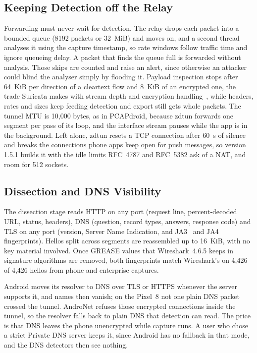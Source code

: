 \documentclass[runningheads]{llncs}
\begin{document}
\subsection{Keeping Detection off the Relay}\label{sec:relay}

Forwarding must never wait for detection. The relay drops each packet into a bounded queue (8192 packets or 32~MiB) and moves on, and a second thread analyses it using the capture timestamp, so rate windows follow traffic time and ignore queueing delay. A packet that finds the queue full is forwarded without analysis. Those skips are counted and raise an alert, since otherwise an attacker could blind the analyser simply by flooding it. Payload inspection stops after 64~KiB per direction of a cleartext flow and 8~KiB of an encrypted one, the trade Suricata makes with stream depth and encryption handling~\cite{suricata}, while headers, rates and sizes keep feeding detection and export still gets whole packets. The tunnel MTU is 10,000 bytes, as in PCAPdroid, because zdtun forwards one segment per pass of its loop, and the interface stream pauses while the app is in the background. Left alone, zdtun resets a TCP connection after 60~s of silence and breaks the connections phone apps keep open for push messages, so version 1.5.1 builds it with the idle limits RFC~4787 and RFC~5382 ask of a NAT, and room for 512 sockets.

\subsection{Dissection and DNS Visibility}

The dissection stage reads HTTP on any port (request line, percent-decoded URL, status, headers), DNS (question, record types, answers, response code) and TLS on any port (version, Server Name Indication, and JA3~\cite{ja3} and JA4~\cite{ja4} fingerprints). Hellos split across segments are reassembled up to 16~KiB, with no key material involved. Once GREASE values that Wireshark~4.6.5 keeps in signature algorithms are removed, both fingerprints match Wireshark's on 4{,}426 of 4{,}426 hellos from phone and enterprise captures.

Android moves its resolver to DNS over TLS or HTTPS whenever the server supports it, and names then vanish; on the Pixel~8 not one plain DNS packet crossed the tunnel. AndroNet refuses those encrypted connections inside the tunnel, so the resolver falls back to plain DNS that detection can read. The price is that DNS leaves the phone unencrypted while capture runs. A user who chose a strict Private DNS server keeps it, since Android has no fallback in that mode, and the DNS detectors then see nothing.
\end{document}
